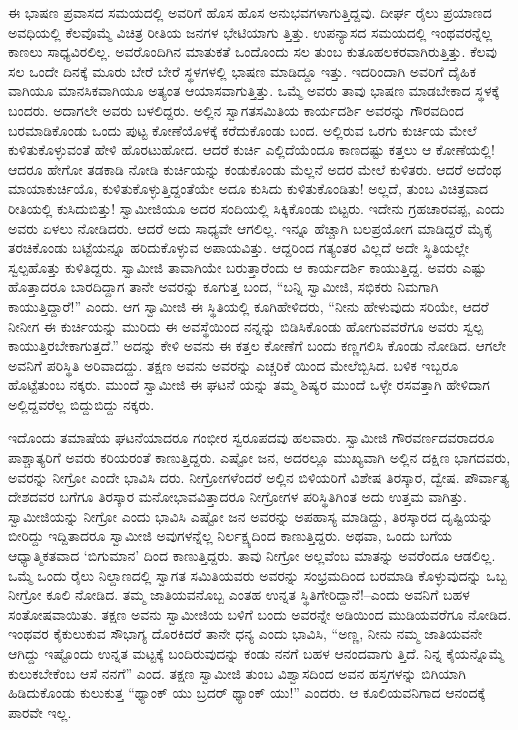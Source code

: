 ಈ ಭಾಷಣ ಪ್ರವಾಸದ ಸಮಯದಲ್ಲಿ ಅವರಿಗೆ ಹೊಸ ಹೊಸ ಅನುಭವಗಳಾಗುತ್ತಿದ್ದವು. ದೀರ್ಘ ರೈಲು ಪ್ರಯಾಣದ ಅವಧಿಯಲ್ಲಿ ಕೆಲವೊಮ್ಮೆ ವಿಚಿತ್ರ ರೀತಿಯ ಜನಗಳ ಭೇಟಿಯಾಗು ತ್ತಿತ್ತು. ಉಪನ್ಯಾಸದ ಸಮಯದಲ್ಲಿ ಇಂಥವರನ್ನೆಲ್ಲ ಕಾಣಲು ಸಾಧ್ಯವಿರಲಿಲ್ಲ. ಅವರೊಂದಿಗಿನ ಮಾತುಕತೆ ಒಂದೊಂದು ಸಲ ತುಂಬ ಕುತೂಹಲಕರವಾಗಿರುತ್ತಿತ್ತು. ಕೆಲವು ಸಲ ಒಂದೇ ದಿನಕ್ಕೆ ಮೂರು ಬೇರೆ ಬೇರೆ ಸ್ಥಳಗಳಲ್ಲಿ ಭಾಷಣ ಮಾಡಿದ್ದೂ ಇತ್ತು. ಇದರಿಂದಾಗಿ ಅವರಿಗೆ ದೈಹಿಕ ವಾಗಿಯೂ ಮಾನಸಿಕವಾಗಿಯೂ ಅತ್ಯಂತ ಆಯಾಸವಾಗುತ್ತಿತ್ತು. ಒಮ್ಮೆ ಅವರು ತಾವು ಭಾಷಣ ಮಾಡಬೇಕಾದ ಸ್ಥಳಕ್ಕೆ ಬಂದರು. ಅದಾಗಲೇ ಅವರು ಬಳಲಿದ್ದರು. ಅಲ್ಲಿನ ಸ್ವಾಗತಸಮಿತಿಯ ಕಾರ್ಯದರ್ಶಿ ಅವರನ್ನು ಗೌರವದಿಂದ ಬರಮಾಡಿಕೊಂಡು ಒಂದು ಪುಟ್ಟ ಕೋಣೆಯೊಳಕ್ಕೆ ಕರೆದುಕೊಂಡು ಬಂದ. ಅಲ್ಲಿರುವ ಒರಗು ಕುರ್ಚಿಯ ಮೇಲೆ ಕುಳಿತುಕೊಳ್ಳುವಂತೆ ಹೇಳಿ ಹೊರಟುಹೋದ. ಆದರೆ ಕುರ್ಚಿ ಎಲ್ಲಿದೆಯೆಂದೂ ಕಾಣದಷ್ಟು ಕತ್ತಲು ಆ ಕೋಣೆಯಲ್ಲಿ! ಆದರೂ ಹೇಗೋ ತಡಕಾಡಿ ನೋಡಿ ಕುರ್ಚಿಯನ್ನು ಕಂಡುಕೊಂಡು ಮೆಲ್ಲನೆ ಅದರ ಮೇಲೆ ಕುಳಿತರು. ಆದರೆ ಅದೆಂಥ ಮಾಯಾಕುರ್ಚಿಯೊ, ಕುಳಿತುಕೊಳ್ಳುತ್ತಿದ್ದಂತೆಯೇ ಅದೂ ಕುಸಿದು ಕುಳಿತುಕೊಂಡಿತು! ಅಲ್ಲದೆ, ತುಂಬ ವಿಚಿತ್ರವಾದ ರೀತಿಯಲ್ಲಿ ಕುಸಿದುಬಿತ್ತು! ಸ್ವಾಮೀಜಿಯೂ ಅದರ ಸಂದಿಯಲ್ಲಿ ಸಿಕ್ಕಿಕೊಂಡು ಬಿಟ್ಟರು. ಇದೇನು ಗ್ರಹಚಾರವಪ್ಪ, ಎಂದು ಅವರು ಏಳಲು ನೋಡಿದರು. ಆದರೆ ಅದು ಸಾಧ್ಯವೇ ಆಗಲಿಲ್ಲ. ಇನ್ನೂ ಹೆಚ್ಚಾಗಿ ಬಲಪ್ರಯೋಗ ಮಾಡಿದ್ದರೆ ಮೈಕೈ ತರಚಿಕೊಂಡು ಬಟ್ಟೆಯನ್ನೂ ಹರಿದುಕೊಳ್ಳುವ ಅಪಾಯವಿತ್ತು. ಆದ್ದರಿಂದ ಗತ್ಯಂತರ ವಿಲ್ಲದೆ ಅದೇ ಸ್ಥಿತಿಯಲ್ಲೇ ಸ್ವಲ್ಪಹೊತ್ತು ಕುಳಿತಿದ್ದರು. ಸ್ವಾಮೀಜಿ ತಾವಾಗಿಯೇ ಬರುತ್ತಾರೆಂದು ಆ ಕಾರ್ಯದರ್ಶಿ ಕಾಯುತ್ತಿದ್ದ. ಅವರು ಎಷ್ಟು ಹೊತ್ತಾದರೂ ಬಾರದಿದ್ದಾಗ ತಾನೇ ಅವರನ್ನು ಕೂಗುತ್ತ ಬಂದ, “ಬನ್ನಿ ಸ್ವಾಮೀಜಿ, ಸಭಿಕರು ನಿಮಗಾಗಿ ಕಾಯುತ್ತಿದ್ದಾರೆ!” ಎಂದು. ಆಗ ಸ್ವಾಮೀಜಿ ಈ ಸ್ಥಿತಿಯಲ್ಲಿ ಕೂಗಿಹೇಳಿದರು, “ನೀನು ಹೇಳುವುದು ಸರಿಯೇ, ಆದರೆ ನೀನೀಗ ಈ ಕುರ್ಚಿಯನ್ನು ಮುರಿದು ಈ ಅವಸ್ಥೆಯಿಂದ ನನ್ನನ್ನು ಬಿಡಿಸಿಕೊಂಡು ಹೋಗುವವರೆಗೂ ಅವರು ಸ್ವಲ್ಪ ಕಾಯುತ್ತಿರಬೇಕಾಗುತ್ತದೆ.” ಅದನ್ನು ಕೇಳಿ ಅವನು ಈ ಕತ್ತಲ ಕೋಣೆಗೆ ಬಂದು ಕಣ್ಣಗಲಿಸಿ ಕೊಂಡು ನೋಡಿದ. ಆಗಲೇ ಅವನಿಗೆ ಪರಿಸ್ಥಿತಿ ಅರಿವಾದದ್ದು. ತಕ್ಷಣ ಅವನು ಅವರನ್ನು ಎಚ್ಚರಿಕೆ ಯಿಂದ ಮೇಲೆಬ್ಬಿಸಿದ. ಬಳಿಕ ಇಬ್ಬರೂ ಹೊಟ್ಟೆತುಂಬ ನಕ್ಕರು. ಮುಂದೆ ಸ್ವಾಮೀಜಿ ಈ ಘಟನೆ ಯನ್ನು ತಮ್ಮ ಶಿಷ್ಯರ ಮುಂದೆ ಒಳ್ಳೇ ರಸವತ್ತಾಗಿ ಹೇಳಿದಾಗ ಅಲ್ಲಿದ್ದವರೆಲ್ಲ ಬಿದ್ದುಬಿದ್ದು ನಕ್ಕರು.

ಇದೊಂದು ತಮಾಷೆಯ ಘಟನೆಯಾದರೂ ಗಂಭೀರ ಸ್ವರೂಪದವು ಹಲವಾರು. ಸ್ವಾಮೀಜಿ ಗೌರವರ್ಣದವರಾದರೂ ಪಾಶ್ಚಾತ್ಯರಿಗೆ ಅವರು ಕರಿಯರಂತೆ ಕಾಣುತ್ತಿದ್ದರು. ಎಷ್ಟೋ ಜನ, ಅದರಲ್ಲೂ ಮುಖ್ಯವಾಗಿ ಅಲ್ಲಿನ ದಕ್ಷಿಣ ಭಾಗದವರು, ಅವರನ್ನು ನೀಗ್ರೋ ಎಂದೇ ಭಾವಿಸಿ ದರು. ನೀಗ್ರೋಗಳೆಂದರೆ ಅಲ್ಲಿನ ಬಿಳಿಯರಿಗೆ ವಿಶೇಷ ತಿರಸ್ಕಾರ, ದ್ವೇಷ. ಪೌರ್ವಾತ್ಯ ದೇಶದವರ ಬಗೆಗೂ ತಿರಸ್ಕಾರ ಮನೋಭಾವವಿತ್ತಾದರೂ ನೀಗ್ರೋಗಳ ಪರಿಸ್ಥಿತಿಗಿಂತ ಅದು ಉತ್ತಮ ವಾಗಿತ್ತು. ಸ್ವಾಮೀಜಿಯನ್ನು ನೀಗ್ರೋ ಎಂದು ಭಾವಿಸಿ ಎಷ್ಟೋ ಜನ ಅವರನ್ನು ಅಪಹಾಸ್ಯ ಮಾಡಿದ್ದು, ತಿರಸ್ಕಾರದ ದೃಷ್ಟಿಯನ್ನು ಬೀರಿದ್ದು ಇದ್ದಿತಾದರೂ ಸ್ವಾಮೀಜಿ ಅವುಗಳನ್ನೆಲ್ಲ ನಿರ್ಲಕ್ಷ್ಯದಿಂದ ಕಾಣುತ್ತಿದ್ದರು. ಅಥವಾ, ಒಂದು ಬಗೆಯ ಆಧ್ಯಾತ್ಮಿಕತವಾದ ‘ಬಿಗುಮಾನ’ ದಿಂದ ಕಾಣುತ್ತಿದ್ದರು. ತಾವು ನೀಗ್ರೋ ಅಲ್ಲವೆಂಬ ಮಾತನ್ನು ಅವರೆಂದೂ ಆಡಲಿಲ್ಲ. ಒಮ್ಮೆ ಒಂದು ರೈಲು ನಿಲ್ದಾಣದಲ್ಲಿ ಸ್ವಾಗತ ಸಮಿತಿಯವರು ಅವರನ್ನು ಸಂಭ್ರಮದಿಂದ ಬರಮಾಡಿ ಕೊಳ್ಳುವುದನ್ನು ಒಬ್ಬ ನೀಗ್ರೋ ಕೂಲಿ ನೋಡಿದ. ತಮ್ಮ ಜಾತಿಯವನೊಬ್ಬ ಎಂತಹ ಉನ್ನತ ಸ್ಥಿತಿಗೇರಿದ್ದಾನೆ!–ಎಂದು ಅವನಿಗೆ ಬಹಳ ಸಂತೋಷವಾಯಿತು. ತಕ್ಷಣ ಅವನು ಸ್ವಾಮೀಜಿಯ ಬಳಿಗೆ ಬಂದು ಅವರನ್ನೇ ಅಡಿಯಿಂದ ಮುಡಿಯವರೆಗೂ ನೋಡಿದ. ಇಂಥವರ ಕೈಕುಲುಕುವ ಸೌಭಾಗ್ಯ ದೊರಕಿದರೆ ತಾನೇ ಧನ್ಯ ಎಂದು ಭಾವಿಸಿ, “ಅಣ್ಣ, ನೀನು ನಮ್ಮ ಜಾತಿಯವನೇ ಆಗಿದ್ದು ಇಷ್ಟೊಂದು ಉನ್ನತ ಮಟ್ಟಕ್ಕೆ ಬಂದಿರುವುದನ್ನು ಕಂಡು ನನಗೆ ಬಹಳ ಆನಂದವಾಗು ತ್ತಿದೆ. ನಿನ್ನ ಕೈಯನ್ನೊಮ್ಮೆ ಕುಲುಕಬೇಕೆಂಬ ಆಸೆ ನನಗೆ” ಎಂದ. ತಕ್ಷಣ ಸ್ವಾಮೀಜಿ ತುಂಬ ವಿಶ್ವಾಸದಿಂದ ಅವನ ಹಸ್ತಗಳನ್ನು ಬಿಗಿಯಾಗಿ ಹಿಡಿದುಕೊಂಡು ಕುಲುಕುತ್ತ “ಥ್ಯಾಂಕ್ ಯು ಬ್ರದರ್ ಥ್ಯಾಂಕ್ ಯು!” ಎಂದರು. ಆ ಕೂಲಿಯವನಿಗಾದ ಆನಂದಕ್ಕೆ ಪಾರವೇ ಇಲ್ಲ.

